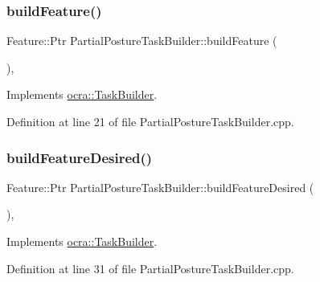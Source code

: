 \subsubsection{\texorpdfstring{build\+Feature()}{buildFeature()}}
{\footnotesize\ttfamily Feature\+::\+Ptr Partial\+Posture\+Task\+Builder\+::build\+Feature (\begin{DoxyParamCaption}{ }\end{DoxyParamCaption})\hspace{0.3cm}{\ttfamily [protected]}, {\ttfamily [virtual]}}



Implements \hyperlink{classocra_1_1TaskBuilder_a58c0dc416a9607a344a080248ee26ac2}{ocra\+::\+Task\+Builder}.



Definition at line 21 of file Partial\+Posture\+Task\+Builder.\+cpp.

\hypertarget{classocra_1_1PartialPostureTaskBuilder_a1a853459b32e838d04205459c608f5b2}{}\label{classocra_1_1PartialPostureTaskBuilder_a1a853459b32e838d04205459c608f5b2} 
\subsubsection{\texorpdfstring{build\+Feature\+Desired()}{buildFeatureDesired()}}
{\footnotesize\ttfamily Feature\+::\+Ptr Partial\+Posture\+Task\+Builder\+::build\+Feature\+Desired (\begin{DoxyParamCaption}{ }\end{DoxyParamCaption})\hspace{0.3cm}{\ttfamily [protected]}, {\ttfamily [virtual]}}



Implements \hyperlink{classocra_1_1TaskBuilder_a7a2c8bcc5d95160d0e48806a2648f1a5}{ocra\+::\+Task\+Builder}.



Definition at line 31 of file Partial\+Posture\+Task\+Builder.\+cpp.

\hypertarget{classocra_1_1PartialPostureTaskBuilder_a70b416b1666a772940d96338a317af0a}{}\label{classocra_1_1PartialPostureTaskBuilder_a70b416b1666a772940d96338a317af0a} 
